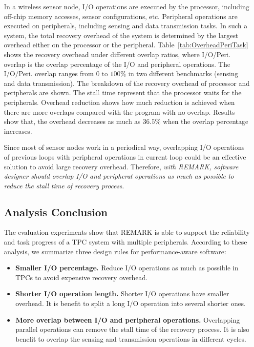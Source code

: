 In a wireless sensor node, I/O operations are executed by the processor, including off-chip memory accesses, sensor configurations, etc.
Peripheral operations are executed on peripherals, including sensing and data transmission tasks.
In such a system, the total recovery overhead of the system is determined by the largest overhead either on the processor or the peripheral.
Table~\ref{tab:OverheadPeriTask} shows the recovery overhead under different overlap ratios, where I/O/Peri. overlap is the overlap percentage of the I/O and peripheral operations.
The I/O/Peri. overlap ranges from $0$ to $100\%$ in two different benchmarks (sensing and data transmission). 
The breakdown of the recovery overhead of processor and peripherals are shown.
The stall time represent that the processor waits for the peripherals.
Overhead reduction shows how much reduction is achieved when there are more overlaps compared with the program with no overlap.
Results show that, the overhead decreases as much as $36.5\%$ when the overlap percentage increases.

Since most of sensor nodes work in a periodical way, overlapping I/O operations of previous loops with peripheral operations in current loop could be an effective solution to avoid large recovery overhead.
Therefore, \emph{with REMARK, software designer should overlap I/O and peripheral operations as much as possible to reduce the stall time of recovery process}.



\subsection{Analysis Conclusion} \label{sec:expRules}
\vspace{-5pt}
%
The evaluation experiments show that REMARK is able to support the reliability and task progress of a TPC system with multiple peripherals.
According to these analysis, we summarize three design rules for performance-aware software:

\begin{itemize}
    \item \textbf{Smaller I/O percentage.} 
        Reduce I/O operations as much as possible in TPCs to avoid expensive recovery overhead.
 
    \item \textbf{Shorter I/O operation length.}  
        Shorter I/O operations have smaller overhead. It is benefit to split a long I/O operation into several shorter ones.
     
    \item \textbf{More overlap between I/O and peripheral operations.} 
        Overlapping parallel operations can remove the stall time of the recovery process. It is also benefit to overlap the sensing and transmission operations in different cycles.

\end{itemize}










